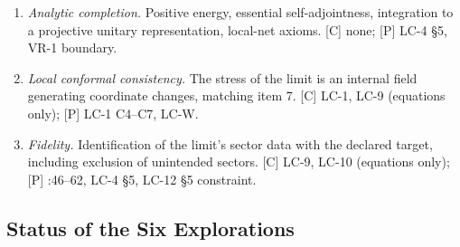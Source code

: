 \begin{enumerate}
\item \emph{Analytic completion.}  Positive energy, essential
self-adjointness, integration to a projective unitary representation,
local-net axioms.  [C] none; [P] LC-4 \S5, VR-1 boundary.
\item \emph{Local conformal consistency.}  The stress of the limit is an
internal field generating coordinate changes, matching item 7.  [C] LC-1,
LC-9 (equations only); [P] LC-1 C4--C7, LC-W.
\item \emph{Fidelity.}  Identification of the limit's sector data with the
declared target, including exclusion of unintended sectors.  [C] LC-9,
LC-10 (equations only); [P] :46--62,
LC-4 \S5, LC-12 \S5 constraint.
\end{enumerate}

\subsection{Status of the Six Explorations}

